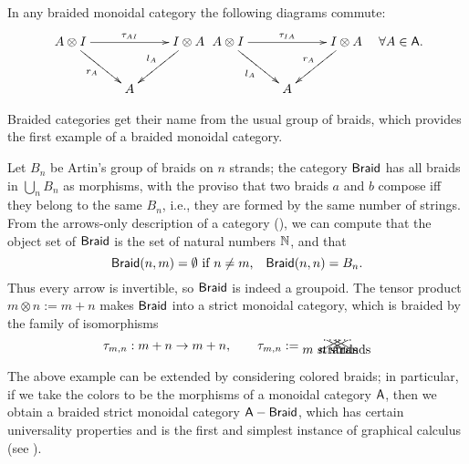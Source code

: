 \begin{proposition}
  In any braided monoidal category the following diagrams commute: 
  \begin{eqnarray*}
    \xymatrix{%
      A\otimes I
      &
      &
      I\otimes A
      \\
      &
      A
      &
      \ar "1,1";"1,3" ^{\tau_{AI}}
      \ar "1,1";"2,2" _{r_A}
      \ar "1,3";"2,2" _{l_A}
      }
    &
    \xymatrix{%
      A\otimes I
      &
      &
      I\otimes A
      \\
      &
      A
      &
      \ar "1,1";"1,3" ^{\tau_{IA}}
      \ar "1,1";"2,2" _{l_A}
      \ar "1,3";"2,2" _{r_A}
      }
    &
    \forall A \in \A.
  \end{eqnarray*}
\end{proposition}

Braided categories get their name from the usual group of braids,
which provides the first example of a braided monoidal category.
\begin{example}\label{xmp:braids}
  Let $B_n$ be Artin's group
  of braids on $n$ strands; the category $\mathsf{Braid}$ has all braids in
  $\bigcup_n B_n$ as morphisms, with the proviso that two braids  $a$ and
  $b$ compose iff they belong to the same $B_n$, i.e., they are formed
  by the same number of strings. From the arrows-only description of a
  category (), we can compute that the object
  set of $\mathsf{Braid}$ is the set of natural numbers $\mathbb{N}$, and that 
  \begin{equation*}
    \mathsf{Braid}(n,m) = \emptyset \text{ if $n\neq m$,} 
    \quad 
    \mathsf{Braid}(n,n) = B_n.
  \end{equation*}
  Thus every arrow is invertible, so $\mathsf{Braid}$ is indeed a
  groupoid. The tensor product $m\otimes n := m+n$ makes $\mathsf{Braid}$ into a
  strict monoidal category, which is braided by the family of
  isomorphisms
  \begin{equation*}
    \tau_{m,n}: m+n \to m+n, 
    \qquad
    \tau_{m,n} := {\xy*!C\xybox{%
      (0,0);(4,2)**\dir{-},
      (2,0);(6,2)**\dir{-},
      (1,0)*{\ldots},(5,2)*{\ldots},
      (1,-0.5)*\txt{$m$ strands},
      (4,0);(0,2)**\dir{-},
      (6,0);(2,2)**\dir{-},
      (5,0)*{\ldots}, (1,2)*{\ldots},
      (5,-0.5)*\txt{$n$ strands}
      }\endxy}
  \end{equation*}
\end{example}

The above example can be extended by considering colored braids; in
particular, if we take the colors to be the morphisms of a monoidal
category $\mathsf{A}$, then we obtain a braided strict monoidal category
$\mathsf{A}-\mathsf{Braid}$, which has certain universality properties and is the
first and simplest instance of graphical calculus (see
\cite{joyal-street;btc}).

